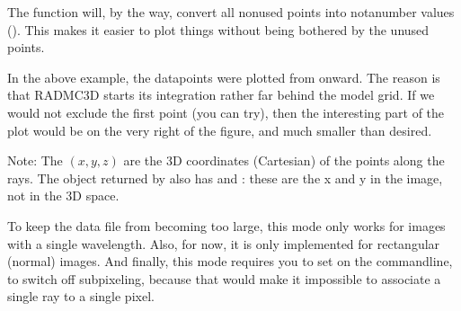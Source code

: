 \documentclass[letterpaper,10pt,english]{sphinxmanual}
\begin{document}
\begin{sphinxVerbatim}[commandchars=\\\{\}]
\end{sphinxVerbatim}

The  function will, by the way, convert all
non\sphinxhyphen{}used points into not\sphinxhyphen{}a\sphinxhyphen{}number values (). This
makes it easier to plot things without being bothered by the
unused points.

In the above example, the datapoints were plotted from  onward.
The reason is that RADMC\sphinxhyphen{}3D starts its integration rather far behind
the model grid. If we would not exclude the first point (you can try),
then the interesting part of the plot would be on the very right of the
figure, and much smaller than desired.

Note: The \((x,y,z)\) are the 3\sphinxhyphen{}D coordinates (Cartesian) of the
points along the rays. The object returned by  also
has  and : these are the x and y in the image,
not in the 3\sphinxhyphen{}D space.

To keep the data file from becoming too large, this mode only works
for images with a single wavelength. Also, for now, it is only
implemented for rectangular (normal) images. And finally, this
mode requires you to set  on the command\sphinxhyphen{}line,
to switch off sub\sphinxhyphen{}pixeling, because that would make it impossible
to associate a single ray to a single pixel.
\end{document}
